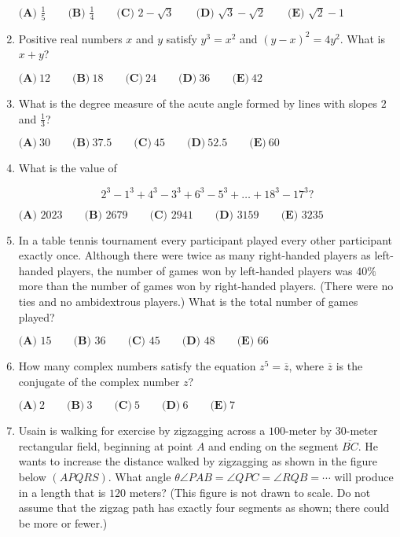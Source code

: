 \documentclass{article}
\begin{document}
\begin{enumerate}[label=\arabic*., itemsep=0.5em]
$\textbf{(A) }\frac15\qquad\textbf{(B) }\frac14\qquad\textbf{(C) }2-\sqrt3\qquad\textbf{(D) }\sqrt3-\sqrt2\qquad\textbf{(E) }\sqrt2-1$\par \vspace{0.5em}\item Positive real numbers $x$ and $y$ satisfy $y^3 = x^2$ and $(y-x)^2 = 4y^2$. What is $x+y$?

$\textbf{(A)}\ 12 \qquad \textbf{(B)}\ 18 \qquad \textbf{(C)}\ 24 \qquad \textbf{(D)}\ 36 \qquad \textbf{(E)}\ 42$\par \vspace{0.5em}\item What is the degree measure of the acute angle formed by lines with slopes $2$ and $\tfrac{1}{3}$?

$\textbf{(A)}~30\qquad\textbf{(B)}~37.5\qquad\textbf{(C)}~45\qquad\textbf{(D)}~52.5\qquad\textbf{(E)}~60$\par \vspace{0.5em}\item What is the value of

\begin{equation*}
2^3 - 1^3 + 4^3 - 3^3 + 6^3 - 5^3 + \dots + 18^3 - 17^3?
\end{equation*}


$\textbf{(A) } 2023 \qquad\textbf{(B) } 2679 \qquad\textbf{(C) } 2941 \qquad\textbf{(D) } 3159 \qquad\textbf{(E) } 3235$\par \vspace{0.5em}\item In a table tennis tournament every participant played every other participant exactly once. Although there were twice as many right-handed players as left-handed players, the number of games won by left-handed players was $40\%$ more than the number of games won by right-handed players. (There were no ties and no ambidextrous players.) What is the total number of games played?

$\textbf{(A) }15\qquad\textbf{(B) }36\qquad\textbf{(C) }45\qquad\textbf{(D) }48\qquad\textbf{(E) }66$\par \vspace{0.5em}\item How many complex numbers satisfy the equation $z^{5}=\overline{z}$, where $\overline{z}$ is the conjugate of the complex number $z$?

$\textbf{(A)}~2\qquad\textbf{(B)}~3\qquad\textbf{(C)}~5\qquad\textbf{(D)}~6\qquad\textbf{(E)}~7$\par \vspace{0.5em}\item Usain is walking for exercise by zigzagging across a $100$-meter by $30$-meter rectangular field, beginning at point $A$ and ending on the segment $\overline{BC}$. He wants to increase the distance walked by zigzagging as shown in the figure below $(APQRS)$. What angle $\theta$$\angle PAB=\angle QPC=\angle RQB=\cdots$ will produce in a length that is $120$ meters? (This figure is not drawn to scale. Do not assume that the zigzag path has exactly four segments as shown; there could be more or fewer.)



\end{enumerate}
\end{document}
